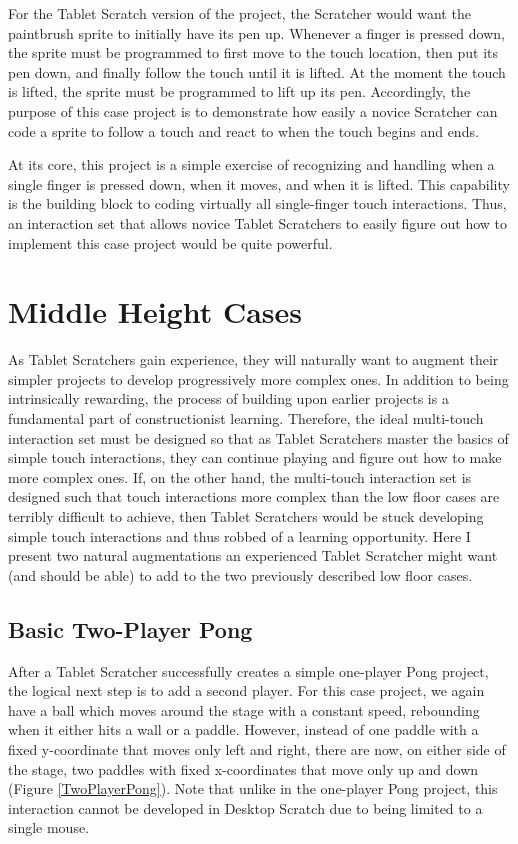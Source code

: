 For the Tablet Scratch version of the project, the Scratcher would want the paintbrush sprite to initially have its pen up. Whenever a finger is pressed down, the sprite must be programmed to first move to the touch location, then put its pen down, and finally follow the touch until it is lifted. At the moment the touch is lifted, the sprite must be programmed to lift up its pen. Accordingly, the purpose of this case project is to demonstrate how easily a novice Scratcher can code a sprite to follow a touch and react to when the touch begins and ends.
 
At its core, this project is a simple exercise of recognizing and handling when a single finger is pressed down, when it moves, and when it is lifted. This capability is the building block to coding virtually all single-finger touch interactions. Thus, an interaction set that allows novice Tablet Scratchers to easily figure out how to implement this case project would be quite powerful.

\section{Middle Height Cases}
As Tablet Scratchers gain experience, they will naturally want to augment their simpler projects to develop progressively more complex ones. In addition to being intrinsically rewarding, the process of building upon earlier projects is a fundamental part of constructionist learning. Therefore, the ideal multi-touch interaction set must be designed so that as Tablet Scratchers master the basics of simple touch interactions, they can continue playing and figure out how to make more complex ones. If, on the other hand, the multi-touch interaction set is designed such that touch interactions more complex than the low floor cases are terribly difficult to achieve, then Tablet Scratchers would be stuck developing simple touch interactions and thus robbed of a learning opportunity. Here I present two natural augmentations an experienced Tablet Scratcher might want (and should be able) to add to the two previously described low floor cases. 

\subsection{Basic Two-Player Pong}
After a Tablet Scratcher successfully creates a simple one-player Pong project, the logical next step is to add a second player. For this case project, we again have a ball which moves around the stage with a constant speed, rebounding when it either hits a wall or a paddle. However, instead of one paddle with a fixed y-coordinate that moves only left and right, there are now, on either side of the stage, two paddles with fixed x-coordinates that move only up and down (Figure \ref{TwoPlayerPong}). Note that unlike in the one-player Pong project, this interaction cannot be developed in Desktop Scratch due to being limited to a single mouse.

